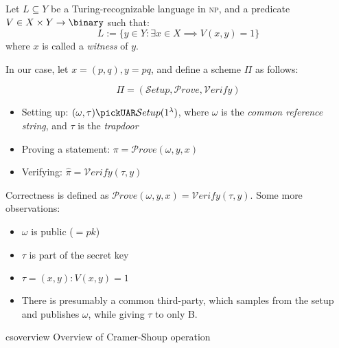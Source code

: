 
Let $L \subseteq Y$ be a Turing-recognizable language in \textsc{np}, and a predicate $V \in X \times Y \to \binary$ such that:
\[
    L := \{y \in Y : \exists x \in X \implies V(x, y) = 1\}
\]
where $x$ is called a \emph{witness} of $y$.


In our case, let $x = (p, q), y = pq$, and define a scheme $\Pi$ as follows:

\[
    \Pi = (\mathcal{S}etup, \mathcal{P}rove, \mathcal{V}erify)
\]

\begin{itemize}
    \item Setting up: $(\omega, \tau) \pickUAR \mathcal{S}etup(1^\lambda)$, where $\omega$ is the \emph{common reference string}, and $\tau$ is the \emph{trapdoor}
    \item Proving a statement: $\pi = \mathcal{P}rove(\omega, y, x)$
    \item Verifying: $\widehat{\pi} = \mathcal{V}erify(\tau, y)$
\end{itemize}

Correctness is defined as $\mathcal{P}rove(\omega, y, x) = \mathcal{V}erify(\tau, y)$. Some more observations:

\begin{itemize}
    \item $\omega$ is public ($ = pk$)
    \item $\tau$ is part of the secret key
    \item $\tau = (x, y) : V(x, y) = 1$ %
    \item There is presumably a common third-party, which samples from the setup and publishes $\omega$, while giving $\tau$ to only B.
\end{itemize}

\begin{cryptosequence}
    {csoverview}
    {Overview of Cramer-Shoup operation}
    

    \cseqdelay

    
\end{cryptosequence}


